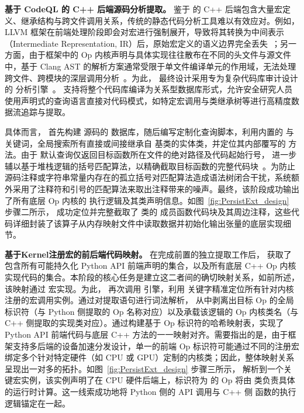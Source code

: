 \textbf{基于 CodeQL 的 C++ 后端源码分析提取。}
鉴于  的 C++ 后端包含大量宏定义、继承结构与跨文件调用关系，传统的静态代码分析工具难以有效应对。例如，LLVM 框架在前端处理阶段即会对宏进行强制展开，导致将其转换为中间表示（Intermediate Representation, IR）后，原始宏定义的语义边界完全丢失~\cite{Lattner2004LLVM}；另一方面，由于框架中的 Op 内核声明与具体实现往往散布在不同的头文件与源文件中，基于 Clang AST 的解析方案通常受限于单文件编译单元的作用域，无法处理跨文件、跨模块的深层调用分析~\cite{ClangAST}。为此， 最终设计采用专为复杂代码库审计设计的  分析引擎~\cite{CodeQL}。 支持将整个代码库编译为关系型数据库形式，允许安全研究人员使用声明式的查询语言直接对代码模式，如特定宏调用与类继承树等进行高精度数据流追踪与提取。

具体而言， 首先构建  源码的  数据库，随后编写定制化查询脚本，利用内置的  与  关键词，全局搜索所有直接或间接继承自  基类的实体类，并定位其内部覆写的  方法。由于  默认查询仅返回目标函数所在文件的绝对路径及代码起始行号， 进一步辅以基于堆栈逻辑的括号匹配算法，以精确截取目标函数的完整代码块~\cite{hu1999calculating}。为防止源码注释或字符串常量内存在的孤立括号对匹配算法造成语法树闭合干扰，系统额外采用了注释符和引号的匹配算法来取出注释带来的噪声。最终，该阶段成功输出了所有底层 Op 内核的  执行逻辑及其类声明信息。如图~\ref{fig:PersistExt_design} 步骤二所示， 成功定位并完整截取了  类的  成员函数代码块及其周边注释，这些代码详细封装了该算子从内存映射文件中读取数据并初始化输出张量的底层实现细节。

\textbf{基于Kernel注册宏的前后端代码映射。}
在完成前置的独立提取工作后， 获取了包含所有可能持久化 Python API 前端声明的集合，以及所有底层 C++ Op 内核实现代码的集合。本阶段的核心任务是建立这二者间的确切映射关系，如前所述，该映射通过  宏实现。为此， 再次调用  引擎，利用  关键字精准定位所有针对内核注册的宏调用实例。通过对提取语句进行词法解析， 从中剥离出目标 Op 的全局标识符（与 Python 侧提取的 Op 名称对应）以及承载该逻辑的 Op 内核类名（与 C++ 侧提取的实现类对应）。通过构建基于 Op 标识符的哈希映射表，实现了 Python API 前端代码与底层 C++  方法的一一映射对齐。需要指出的是，由于框架支持多后端的设备加速分发设计，单一的前端 Op 标识符可能通过不同的注册宏绑定多个针对特定硬件（如 CPU 或 GPU）定制的内核类；因此，整体映射关系呈现出一对多的拓扑。如图~\ref{fig:PersistExt_design} 步骤三所示， 解析到一个关键宏实例，该实例声明了在 CPU 硬件后端上，标识符为  的 Op 将由  类负责具体的运行时计算。这一线索成功地将 Python 侧的  API 调用与 C++ 侧  函数的执行逻辑锚定在一起。

